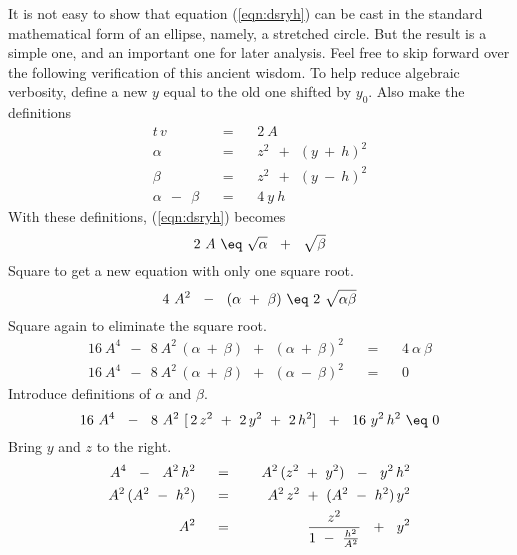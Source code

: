 \par
It is not easy to show that equation (\ref{eqn:dsryh}) can be
cast in the standard mathematical form of an ellipse, namely, 
a stretched circle.
But the result is a simple one,
and an important one for later analysis.
Feel free to skip forward over the following verification
of this ancient wisdom.
To help reduce algebraic verbosity,
define a new  $y$  equal to the old one shifted by  $y_0 $.
Also make the definitions
\begin{eqnarray}
t\,v \ \ \ \ &=&\ \ \ \ 2\ A\  			\label{eqn:mymajor}
\\
\alpha\ \ \ \ &=&\ \ \ \ z^2 \ \ +\ \  (y\ +\ h)^2   \nonumber
\\
\beta\ \ \ \ &=&\ \ \ \ z^2 \ \ +\ \  (y\ -\ h)^2   \nonumber
\\
\alpha\ \ -\ \ \beta\ \ \ \ &=&\ \ \ \ 4\ y\ h  \nonumber
\end{eqnarray}
With these definitions, (\ref{eqn:dsryh}) becomes
\begin{displaymath}
2\ A\  \eq \  \sqrt \alpha \ \ +\ \   \sqrt \beta  
\end{displaymath}
Square to get a new equation with only one square root.
\begin{displaymath}
4\ A^2 \ \ -\ \ (\alpha\ +\ \beta) \  \eq \ 2\  \sqrt{ \alpha \beta }
\end{displaymath}
Square again to eliminate the square root.
\begin{eqnarray*}
16\ A^4 \ \ -\ \ 8\ A^2 \, (\alpha\ +\ \beta) \ \ +\ \ (\alpha\ +\ \beta)^2 \ \ \ \ &=&
\ \ \ \ 4\ \alpha\ \beta
\\
16\ A^4 \ \ -\ \ 8\ A^2 \, (\alpha\ +\ \beta) \ \ +\ \ (\alpha\ -\ \beta)^2 \ \ \ \ &=&
\ \ \ \ 0
\end{eqnarray*}
Introduce definitions of  $\alpha$  and  $\beta$.
\begin{displaymath}
16\ A^4 \ \ -\ \  8\ A^2 \ [\,2\,z^2 \ +\ 2\,y^2 \ +\  2\,h^2 ] \ \ +\ \ 
16\ y^2 \, h^2 \  \eq \ 0 
\end{displaymath}
Bring  $y$  and  $z$  to the right.
\begin{eqnarray}
A^4 \ \ -\ \  A^2 \, h^2 \ \ \ \ &=&\ \ \ \ 		\nonumber
A^2 \, ( z^2 \ +\  y^2 ) \ \ -\ \  y^2 \, h^2
\\
A^2 \, ( A^2 \ -\  h^2 ) \ \ \ \ &=&\ \ \ \ 
A^2 \,  z^2 \ +\   ( A^2 \ -\   h^2 ) \, y^2		\nonumber
\\
A^2 \ \ \ \ &=&\ \ \ \  {z^2  \over 1 \ -\  {h^2  \over A^2}}\ \ +\ \ y^2
							\label{eqn:torick}
\end{eqnarray}
